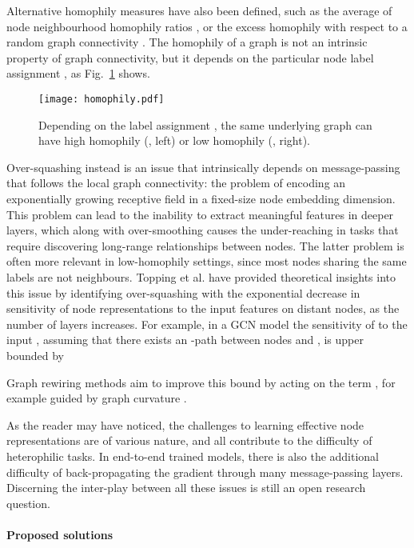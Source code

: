\documentclass[final,5p,times,twocolumn]{elsarticle}
\begin{document}
Alternative homophily measures have also been defined, such as the average of node neighbourhood homophily ratios  \cite{Pei2020}, or the excess homophily with respect to a random graph connectivity \cite{Lim2021}.
The homophily of a graph is not an intrinsic property of graph connectivity, but it depends on the particular node label assignment , as Fig.~\ref{fig:homophily} shows.

\begin{figure}
\centering
\texttt{[image: homophily.pdf]}
\caption{Depending on the label assignment , the same underlying graph  can have high homophily (, left) or low homophily (, right).}
\label{fig:homophily}
\end{figure}

Over-squashing instead is an issue that intrinsically depends on message-passing that follows the local graph connectivity: the problem of encoding an exponentially growing receptive field \citep{Micheli2009} in a fixed-size node embedding dimension.
This problem can lead to the inability to extract meaningful features in deeper layers, which along with over-smoothing causes the under-reaching in tasks that require discovering long-range relationships between nodes.
The latter problem is often more relevant in low-homophily settings, since most nodes sharing the same labels are not neighbours.
Topping et al. \cite{Topping2022} have provided theoretical insights into this issue by identifying over-squashing with the exponential decrease in sensitivity of node representations to the input features on distant nodes, as the number of layers increases.
For example, in a GCN model \cite{Kipf2017} the sensitivity of  to the input , assuming that there exists an -path between nodes  and , is upper bounded by

Graph rewiring methods aim to improve this bound by acting on the term , for example guided by graph curvature \cite{Topping2022}.

As the reader may have noticed, the challenges to learning effective node representations are of various nature, and all contribute to the difficulty of heterophilic tasks.
In end-to-end trained models, there is also the additional difficulty of back-propagating the gradient through many message-passing layers.
Discerning the inter-play between all these issues is still an open research question.

\paragraph{Proposed solutions}
\end{document}
